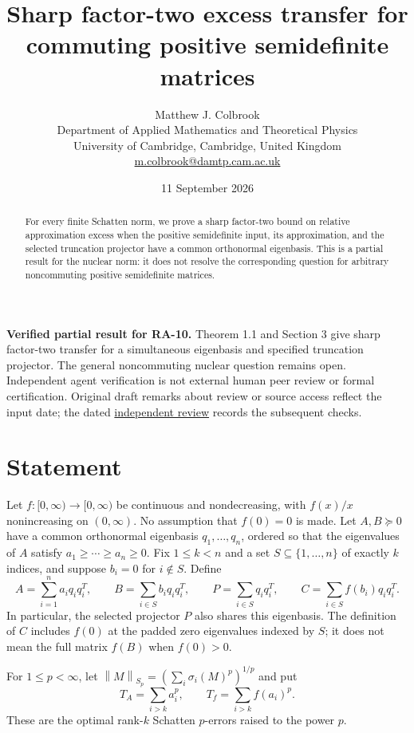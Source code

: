 \documentclass[11pt]{article}
\title{Sharp factor-two excess transfer for commuting positive semidefinite matrices}
\author{Matthew J. Colbrook\\\small Department of Applied Mathematics and Theoretical Physics\\\small University of Cambridge, Cambridge, United Kingdom\\\small\href{mailto:m.colbrook@damtp.cam.ac.uk}{m.colbrook@damtp.cam.ac.uk}}
\date{11 September 2026}
\theoremstyle{definition}
\newcommand{\norm}[1]{\left\lVert#1\right\rVert}
\begin{document}
\maketitle

\noindent\textbf{Verified partial result for RA-10.} Theorem 1.1 and Section 3 give sharp factor-two transfer for a simultaneous eigenbasis and specified truncation projector. The general noncommuting nuclear question remains open.
Independent agent verification is not external human peer review or formal certification. Original draft remarks about review or source access reflect the input date; the dated \href{https://github.com/MColbrook/OpenProblemsInNLA/blob/codex/colbrook-transfer-resolutions/references/colbrook-transfer-2026-09-11/verification/reviews/RA-10-review.md}{independent review} records the subsequent checks.
\par\medskip

\begin{abstract}
For every finite Schatten norm, we prove a sharp factor-two bound on relative approximation excess when the positive semidefinite input, its approximation, and the selected truncation projector have a common orthonormal eigenbasis. This is a partial result for the nuclear norm: it does not resolve the corresponding question for arbitrary noncommuting positive semidefinite matrices.
\end{abstract}

\section{Statement}
Let $f:[0,\infty)\to[0,\infty)$ be continuous and nondecreasing, with $f(x)/x$ nonincreasing on $(0,\infty)$. No assumption that $f(0)=0$ is made.
Let $A,B\succeq0$ have a common orthonormal eigenbasis $q_1,\ldots,q_n$, ordered so that the eigenvalues of $A$ satisfy $a_1\ge\cdots\ge a_n\ge0$. Fix $1\le k<n$ and a set $S\subseteq\{1,\ldots,n\}$ of exactly $k$ indices, and suppose $b_i=0$ for $i\notin S$. Define
\[
 A=\sum_{i=1}^n a_iq_iq_i^T,\qquad
 B=\sum_{i\in S}b_iq_iq_i^T,\qquad
 P=\sum_{i\in S}q_iq_i^T,\qquad
 C=\sum_{i\in S}f(b_i)q_iq_i^T.
\]
In particular, the selected projector $P$ also shares this eigenbasis. The definition of $C$ includes $f(0)$ at the padded zero eigenvalues indexed by $S$; it does not mean the full matrix $f(B)$ when $f(0)>0$.

For $1\le p<\infty$, let $\norm{M}_{S_p}=(\sum_i\sigma_i(M)^p)^{1/p}$ and put
\[
 T_A=\sum_{i>k}a_i^p,\qquad
 T_f=\sum_{i>k}f(a_i)^p.
\]
These are the optimal rank-$k$ Schatten $p$-errors raised to the power $p$.
\end{document}
